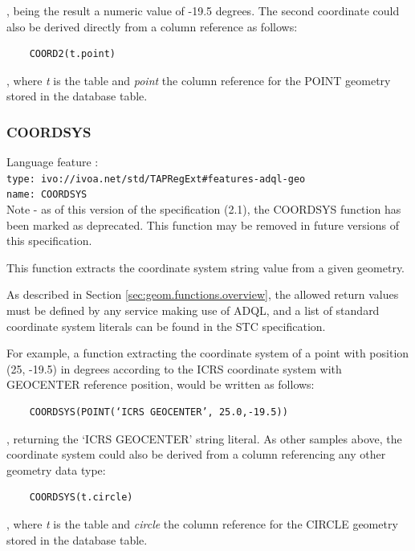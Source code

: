 \documentclass[11pt,a4paper]{ivoa}
\begin{document}
, being the result a numeric value of -19.5 degrees. The second coordinate
could also be derived directly from a column reference as follows:

\begin{verbatim}
    COORD2(t.point)
\end{verbatim}

, where \textit{t} is the table and \textit{point} the column reference for
the POINT geometry stored in the database table.

\subsubsection{COORDSYS}
\label{sec:geom.functions.coordsys}
{\footnotesize Language feature :}\\
{\footnotesize \verb|type: ivo://ivoa.net/std/TAPRegExt#features-adql-geo|}\\
{\footnotesize \verb|name: COORDSYS|}\\

Note - as of this version of the specification (2.1), the COORDSYS function has
been marked as deprecated. This function may be removed in future versions
of this specification.

This function extracts the coordinate system string value from a given
geometry.

As described in Section \ref{sec:geom.functions.overview}, the allowed return values must be defined
by any service making use of ADQL, and a list of standard coordinate system
literals can be found in the STC specification.

For example, a function extracting the coordinate system of a point with
position (25, -19.5) in degrees according to the ICRS coordinate system with
GEOCENTER reference position, would be written as follows:

\begin{verbatim}
    COORDSYS(POINT(‘ICRS GEOCENTER’, 25.0,-19.5))
\end{verbatim}

, returning the ‘ICRS GEOCENTER’ string literal. As other samples above,
the coordinate system could also be derived from a column referencing any
other geometry data type:

\begin{verbatim}
    COORDSYS(t.circle)
\end{verbatim}

, where \textit{t} is the table and \textit{circle} the column reference
for the CIRCLE geometry stored in the database table.
\end{document}
